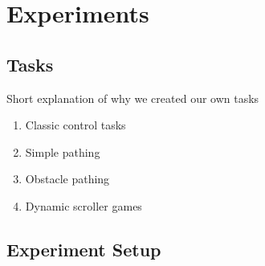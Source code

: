 \section{Experiments}

\subsection{Tasks}
Short explanation of why we created our own tasks
\begin{enumerate}
	\item Classic control tasks
	\item Simple pathing
	\item Obstacle pathing
	\item Dynamic scroller games
\end{enumerate}

\subsection{Experiment Setup}